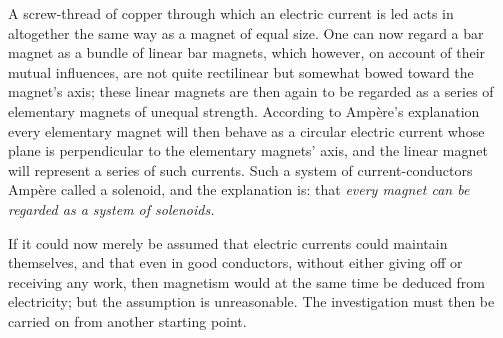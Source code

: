\documentclass[12pt,a4paper]{book}
\begin{document}
A screw-thread of copper through which an electric current is led acts in altogether the same way as a magnet of equal
size. One can now regard a bar magnet as a bundle of linear bar magnets, which however, on account of their mutual
influences, are not quite rectilinear but somewhat bowed toward the magnet's axis; these linear magnets are then again to
be regarded as a series of elementary magnets of unequal strength. According to Ampère's explanation every elementary
magnet will then behave as a circular electric current whose plane is perpendicular to the elementary magnets' axis, and
the linear magnet will represent a series of such currents. Such a system of current-conductors Ampère called a solenoid,
and the explanation is: that \emph{every magnet can be regarded as a system of solenoids.}

If it could now merely be assumed that electric currents could maintain themselves, and that even in good conductors,
without either giving off or receiving any work, then magnetism would at the same time be deduced from electricity; but
the assumption is unreasonable. The investigation must then be carried on from another starting point.
\end{document}
